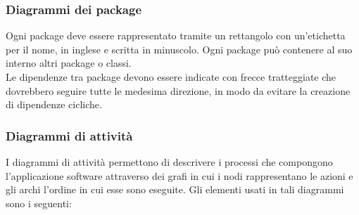     	\subsubsection*{Diagrammi dei package}
    	Ogni package deve essere rappresentato tramite un rettangolo con un'etichetta per il nome, in inglese e scritta in minuscolo. Ogni package può contenere al suo interno altri package o classi. \\
    	Le dipendenze tra package devono essere indicate con frecce tratteggiate che dovrebbero seguire tutte le medesima direzione, in modo da evitare la creazione di dipendenze cicliche. 
    	
    	\subsubsection*{Diagrammi di attività}
    	I diagrammi di attività permettono di descrivere i processi che compongono l'applicazione software attraverso dei grafi in cui i nodi rappresentano le azioni e gli archi l'ordine in cui esse sono eseguite.
    	Gli elementi usati in tali diagrammi sono i seguenti: 
